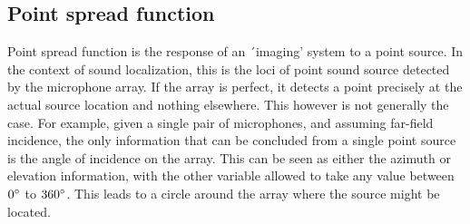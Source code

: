 \subsection{Point spread function}
Point spread function is the response of an ´imaging' system to a point source. In the context of sound localization, this is the loci of point sound source detected by the microphone array. If the array is perfect, it detects a point precisely at the actual source location and nothing elsewhere. This however is not generally the case. For example, given a single pair of microphones, and assuming far-field incidence, the only information that can be concluded from a single point source is the angle of incidence on the array. This can be seen as either the azimuth or elevation information, with the other variable allowed to take any value between $0\degree$ to $360\degree$. This leads to a circle around the array where the source might be located. 


